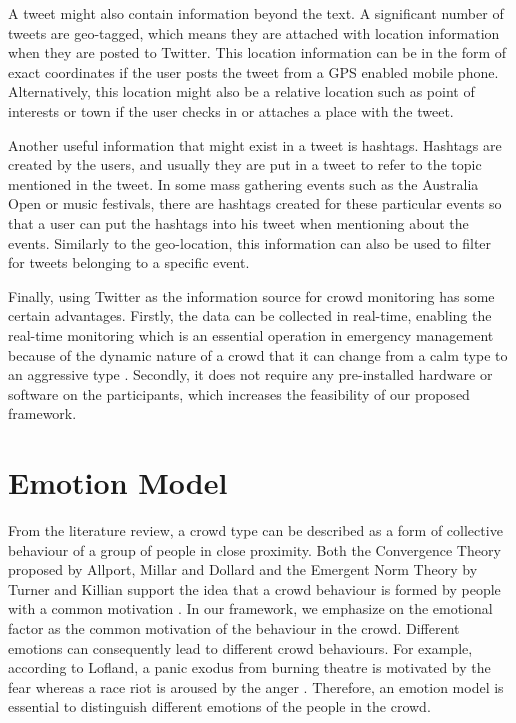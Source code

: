 A tweet might also contain information beyond the text. A significant number of tweets are geo-tagged, which means they are attached with location information when they are posted to Twitter. This location information can be in the form of exact coordinates if the user posts the tweet from a GPS enabled mobile phone. Alternatively, this location might also be a relative location such as point of interests or town if the user checks in or attaches a place with the tweet.

Another useful information that might exist in a tweet is hashtags. Hashtags are created by the users, and usually they are put in a tweet to refer to the topic mentioned in the tweet. In some mass gathering events such as the Australia Open or music festivals, there are hashtags created for these particular events so that a user can put the hashtags into his tweet when mentioning about the events. Similarly to the geo-location, this information can also be used to filter for tweets belonging to a specific event.

Finally, using Twitter as the information source for crowd monitoring has some certain advantages. Firstly, the data can be collected in real-time, enabling the real-time monitoring which is an essential operation in emergency management because of the dynamic nature of a crowd that it can change from a calm type to an aggressive type \citep{Berlonghi1995}. Secondly, it does not require any pre-installed hardware or software on the participants, which increases the feasibility of our proposed framework.

\section{Emotion Model}

From the literature review, a crowd type can be described as a form of collective behaviour of a group of people in close proximity. Both the Convergence Theory proposed by Allport, Millar and Dollard and the Emergent Norm Theory by Turner and Killian support the idea that a crowd behaviour is formed by people with a common motivation \citep{mcphail1991myth}. In our framework, we emphasize on the emotional factor as the common motivation of the behaviour in the crowd. Different emotions can consequently lead to different crowd behaviours. For example, according to Lofland, a panic exodus from burning theatre is motivated by the fear whereas a race riot is aroused by the anger \citep{Kornblum2011}. Therefore, an emotion model is essential to distinguish different emotions of the people in the crowd.

